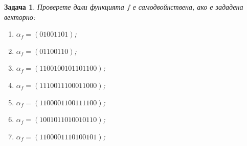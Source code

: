 \documentclass[a4paper]{article}
\newtheorem{problem}{Задача}
\begin{document}
\begin{problem}
  Проверете дали функцията $f$ е самодвойнствена, ако е зададена векторно:
  \begin{enumerate}[1)]
  \item
    $\alpha_f = (01001101)$;
  \item
    $\alpha_f = (01100110)$;
  \item
    $\alpha_f = (1100 1001 0110 1100)$;
  \item
    $\alpha_f = (1110 0111 0001 1000)$;
  \item
    $\alpha_f = (1100 0011 0011 1100)$;
  \item
    $\alpha_f = (1001 0110 1001 0110)$;
  \item
    $\alpha_f = (1100 0011 1010 0101)$;
  \end{enumerate}
\end{problem}
\end{document}
